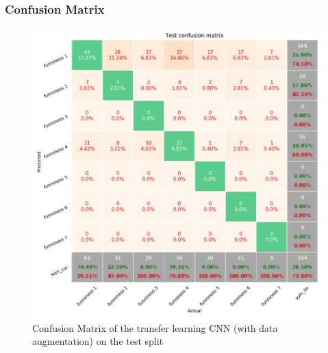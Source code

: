 \documentclass[draft,final,oneside]{vutinfth} %
\begin{document}
\subsubsection{Confusion Matrix}
\begin{figure}
	\centering
  	\includegraphics[width=1.0\textwidth]{graphics/transfer_confusion_test.png}
	\caption{Confusion Matrix of the transfer learning CNN (with data augmentation) on the test split}
	\label{fig:confusionmatrixtransferlearningtest}
\end{figure}
\end{document}
